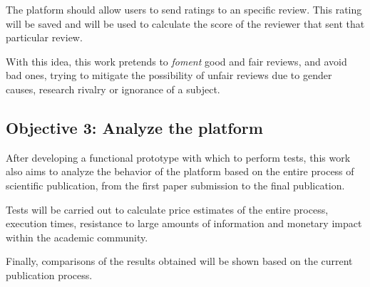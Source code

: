The platform should allow users to send ratings to an specific review. This
rating will be saved and will be used to calculate the score of the reviewer
that sent that particular review.

With this idea, this work pretends to \emph{foment} good and fair reviews, and
avoid bad ones, trying to mitigate the possibility of unfair reviews due to
gender causes, research rivalry or ignorance of a subject.

\subsection*{Objective 3: Analyze the platform}

After developing a functional prototype with which to perform tests, this work
also aims to analyze the behavior of the platform based on the entire process of
scientific publication, from the first paper submission to the final
publication.

Tests will be carried out to calculate price estimates of the entire process,
execution times, resistance to large amounts of information and monetary impact
within the academic community.

Finally, comparisons of the results obtained will be shown based on the current
publication process.

